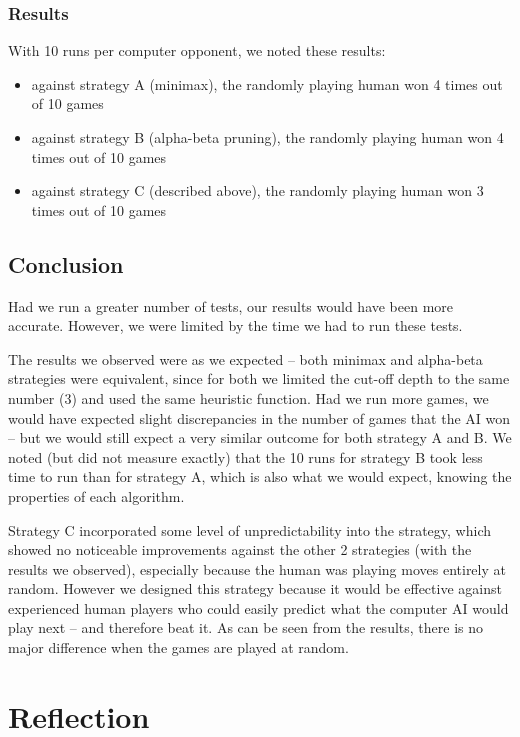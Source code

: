 \documentclass[12pt]{article}
\begin{document}
\subsubsection{Results}
With 10 runs per computer opponent, we noted these results:
\begin{itemize}
 \item against strategy A (minimax), the randomly playing human won 4 times out of 10 games
 \item against strategy B (alpha-beta pruning), the randomly playing human won 4 times out of 10 games
 \item against strategy C (described above), the randomly playing human won 3 times out of 10 games
\end{itemize}

\subsection{Conclusion}
Had we run a greater number of tests, our results would have been more accurate. However, we were limited
by the time we had to run these tests.

The results we observed were as we expected -- both minimax and alpha-beta strategies were equivalent,
since for both we limited the cut-off depth to the same number (3) and used the same heuristic function.
Had we run more games, we would have expected slight discrepancies in the number of games that the AI
won -- but we would still expect a very similar outcome for both strategy A and B. We noted (but did not
measure exactly) that the 10 runs for strategy B took less time to run than for strategy A, which is also
what we would expect, knowing the properties of each algorithm.

Strategy C incorporated some level of unpredictability into the strategy, which showed no noticeable
improvements against the other 2 strategies (with the results we observed), especially because the human
was playing moves entirely at random. However we designed this strategy because it would be effective
against experienced human players who could easily predict what the computer AI would play next -- and
therefore beat it. As can be seen from the results, there is no major difference when the games are played
at random.

\section{Reflection}
\end{document}
